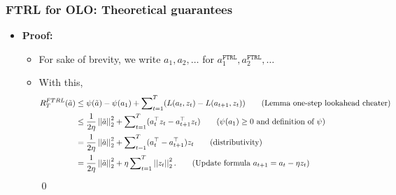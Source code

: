 \documentclass[11pt,compress,t,notes=noshow, xcolor=table]{beamer}
\renewcommand{\l}{L}
\newcommand{\norm}[1]{\left|\left|#1\right|\right|_2}
\newcommand{\FTRL}{\texttt{FTRL}}
\newcommand{\reg}{\psi}
\begin{document}
\begin{frame} 
	\frametitle{FTRL for OLO: Theoretical guarantees}
	\small
	\begin{itemize}
		\footnotesize
		
		\item \textbf{Proof:}
		\begin{itemize}\footnotesize
			
			 \item 	For sake of brevity, we write $a_1, a_2, \ldots$ for $a_1^{\FTRL}, a_2^{\FTRL}, \ldots$ 
			 \item With this,
			\begin{align*}
				R_T^{FTRL}(\tilde a) &\leq \reg(\tilde a) - \reg(a_1) + \sum\nolimits_{t=1}^T (\l(a_t,z_t) - \l(a_{t+1},z_t)) \tag{Lemma one-step lookahead cheater} \\
				 &\leq \frac{1}{2\eta}  \norm{\tilde a}^2 + \sum\nolimits_{t=1}^T ( a_t^\top z_t  -  a_{t+1}^\top z_t  ) \tag{$\reg(a_1)\geq 0$ and definition of $\reg$} \\
				 &= \frac{1}{2\eta}  \norm{\tilde a}^2 + \sum\nolimits_{t=1}^T  ( a_t^\top-  a_{t+1}^\top   )z_t \tag{distributivity} \\
				 &= \frac{1}{2\eta}  \norm{\tilde a}^2 + \eta \sum\nolimits_{t=1}^T   \norm{z_t}^2.  \tag{Update formula $	a_{t+1} = a_t - \eta z_t$}
			\end{align*}
			\qed
		\end{itemize}
%		
	\end{itemize}
\end{frame}
\end{document}
